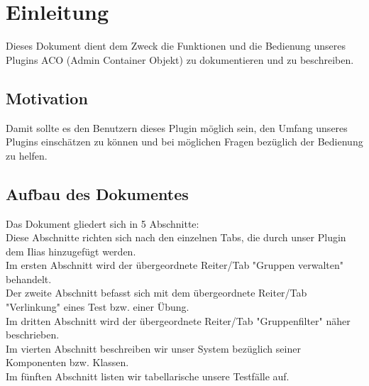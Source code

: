 \chapter{Einleitung}
Dieses Dokument dient dem Zweck die Funktionen und die Bedienung unseres Plugins ACO (Admin Container Objekt) zu dokumentieren und zu beschreiben.  

\section*{Motivation}
Damit sollte es den Benutzern dieses Plugin möglich sein, den Umfang unseres Plugins einschätzen zu können und bei möglichen Fragen bezüglich der Bedienung zu helfen.  

\section*{Aufbau des Dokumentes}
Das Dokument gliedert sich in 5 Abschnitte:\\
Diese Abschnitte richten sich nach den einzelnen Tabs, die durch unser Plugin dem Ilias hinzugefügt werden.\\
Im ersten Abschnitt wird der übergeordnete Reiter/Tab "Gruppen verwalten" behandelt.\\
Der zweite Abschnitt befasst sich mit dem übergeordnete Reiter/Tab "Verlinkung" eines Test bzw. einer Übung.\\
Im dritten Abschnitt wird der übergeordnete Reiter/Tab "Gruppenfilter" näher beschrieben.\\
Im vierten Abschnitt beschreiben wir unser System bezüglich seiner Komponenten bzw. Klassen. \\
Im fünften Abschnitt listen wir tabellarische unsere Testfälle auf. 
 